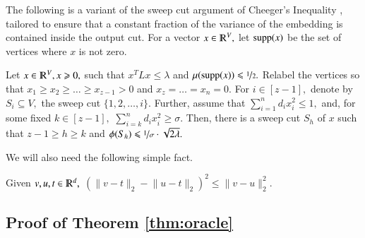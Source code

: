 \documentclass[twoside,leqno,twocolumn]{article}
\newcommand{\nfrac}{\nicefrac}
\renewcommand{\mathbb}{\varmathbb}
\renewcommand{\leq}{\leqslant}
\renewcommand{\geq}{\geqslant}
\newcommand{\norm}[1]{\lVert#1\rVert}
\newcommand{\supp}{\mathrm{supp}}
\newcommand{\R}{\mathbb R}
\numberwithin{equation}{section}
\begin{document}
The following is a variant of the sweep cut argument of Cheeger's Inequality \cite{FAN}, tailored to ensure that a constant fraction of the variance of the embedding is contained inside the output cut.
For a vector $x \in \R^{V},$ let ${\rm supp}(x)$ be the set of vertices where $x$ is not zero. 
\begin{lemma} \label{lem:cheeger}
Let $x \in \R^V, x \geq 0,$ such that  $x^T L x \leq \lambda$ and $\mu(\supp(x)) \leq \nfrac{1}{2}.$ Relabel the vertices so that $x_1 \geq x_2 \geq \ldots \geq x_{z-1} > 0$ and $x_{z} = \ldots = x_n = 0.$ For $i \in [z-1],$ denote by $S_i \subseteq V,$ the sweep cut $\{1, 2, \ldots, i\}.$ 
Further, assume that $\sum_{i=1}^n d_i x_i^2 \leq 1,$ and, for some fixed $k \in [z-1],$ $\sum_{i=k}^{n} d_i x_i^2 \geq \sigma.$
Then, there is a sweep cut $S_h$ of $x$ such that $ z-1 \geq h \geq k$ and $\phi(S_h) \leq \nfrac{1}{\sigma} \cdot \sqrt{ 2 \lambda}.$
\end{lemma}

\noindent
We will also need the following simple fact.
\begin{fact} \label{fct:triangle}
Given $v,u, t \in \R^d,$ $\left(\norm{v-t}_2 - \norm{u-t}_2\right)^2 \leq \norm{v - u}_2^2.$
\end{fact}





\subsection{Proof of Theorem \ref{thm:oracle}}
\end{document}
